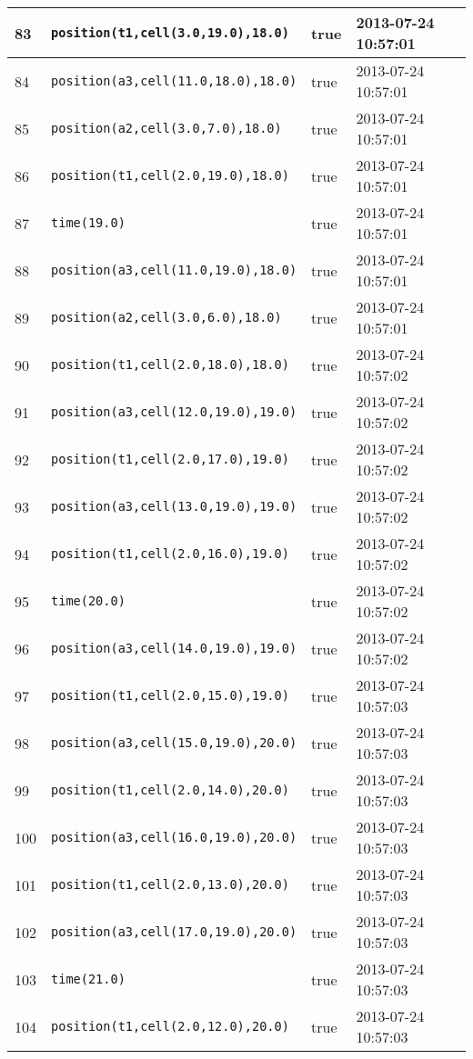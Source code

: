 \documentclass[11pt]{article}\usepackage[utf8]{inputenc}\usepackage{geometry}
\begin{document}
\begin{table}[ht]
\begin{tabular}{l l l l}
83&\texttt{position(t1,cell(3.0,19.0),18.0)}&true&2013-07-24 10:57:01\\ [1ex] \hline
84&\texttt{position(a3,cell(11.0,18.0),18.0)}&true&2013-07-24 10:57:01\\ [1ex] \hline
85&\texttt{position(a2,cell(3.0,7.0),18.0)}&true&2013-07-24 10:57:01\\ [1ex] \hline
86&\texttt{position(t1,cell(2.0,19.0),18.0)}&true&2013-07-24 10:57:01\\ [1ex] \hline
87&\texttt{time(19.0)}&true&2013-07-24 10:57:01\\ [1ex] \hline
88&\texttt{position(a3,cell(11.0,19.0),18.0)}&true&2013-07-24 10:57:01\\ [1ex] \hline
89&\texttt{position(a2,cell(3.0,6.0),18.0)}&true&2013-07-24 10:57:01\\ [1ex] \hline
90&\texttt{position(t1,cell(2.0,18.0),18.0)}&true&2013-07-24 10:57:02\\ [1ex] \hline
91&\texttt{position(a3,cell(12.0,19.0),19.0)}&true&2013-07-24 10:57:02\\ [1ex] \hline
92&\texttt{position(t1,cell(2.0,17.0),19.0)}&true&2013-07-24 10:57:02\\ [1ex] \hline
93&\texttt{position(a3,cell(13.0,19.0),19.0)}&true&2013-07-24 10:57:02\\ [1ex] \hline
94&\texttt{position(t1,cell(2.0,16.0),19.0)}&true&2013-07-24 10:57:02\\ [1ex] \hline
95&\texttt{time(20.0)}&true&2013-07-24 10:57:02\\ [1ex] \hline
96&\texttt{position(a3,cell(14.0,19.0),19.0)}&true&2013-07-24 10:57:02\\ [1ex] \hline
97&\texttt{position(t1,cell(2.0,15.0),19.0)}&true&2013-07-24 10:57:03\\ [1ex] \hline
98&\texttt{position(a3,cell(15.0,19.0),20.0)}&true&2013-07-24 10:57:03\\ [1ex] \hline
99&\texttt{position(t1,cell(2.0,14.0),20.0)}&true&2013-07-24 10:57:03\\ [1ex] \hline
100&\texttt{position(a3,cell(16.0,19.0),20.0)}&true&2013-07-24 10:57:03\\ [1ex] \hline
101&\texttt{position(t1,cell(2.0,13.0),20.0)}&true&2013-07-24 10:57:03\\ [1ex] \hline
102&\texttt{position(a3,cell(17.0,19.0),20.0)}&true&2013-07-24 10:57:03\\ [1ex] \hline
103&\texttt{time(21.0)}&true&2013-07-24 10:57:03\\ [1ex] \hline
104&\texttt{position(t1,cell(2.0,12.0),20.0)}&true&2013-07-24 10:57:03\\ [1ex] \hline

\end{tabular}
\end{table}
\end{document}
